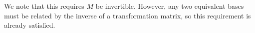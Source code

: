 \documentclass[modern]{aastex62}
\begin{document}
We note that this requires $M$ be invertible.
However, any two equivalent bases must be related by the inverse of a transformation matrix, so this requirement is already satisfied.



% 
%

\end{document}

